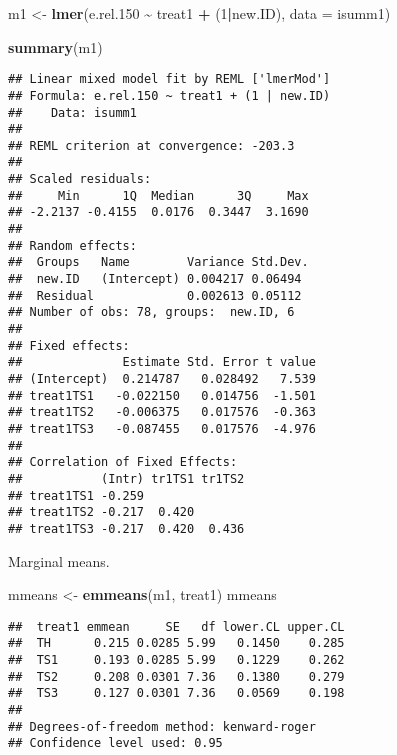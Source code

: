 \documentclass[
]{article}
\newenvironment{Shaded}{\begin{snugshade}}{\end{snugshade}}
\newcommand{\AttributeTok}[1]{\textcolor[rgb]{0.13,0.29,0.53}{#1}}
\newcommand{\DecValTok}[1]{\textcolor[rgb]{0.00,0.00,0.81}{#1}}
\newcommand{\FloatTok}[1]{\textcolor[rgb]{0.00,0.00,0.81}{#1}}
\newcommand{\FunctionTok}[1]{\textcolor[rgb]{0.13,0.29,0.53}{\textbf{#1}}}
\newcommand{\NormalTok}[1]{#1}
\newcommand{\OtherTok}[1]{\textcolor[rgb]{0.56,0.35,0.01}{#1}}
\newcommand{\SpecialCharTok}[1]{\textcolor[rgb]{0.81,0.36,0.00}{\textbf{#1}}}
\newcommand{\StringTok}[1]{\textcolor[rgb]{0.31,0.60,0.02}{#1}}
\begin{document}
\begin{Shaded}
\begin{Highlighting}[]
\NormalTok{m1 }\OtherTok{\textless{}{-}} \FunctionTok{lmer}\NormalTok{(e.rel}\FloatTok{.150} \SpecialCharTok{\textasciitilde{}}\NormalTok{ treat1 }\SpecialCharTok{+}\NormalTok{ (}\DecValTok{1}\SpecialCharTok{|}\NormalTok{new.ID), }\AttributeTok{data =}\NormalTok{ isumm1)}
\end{Highlighting}
\end{Shaded}

\begin{Shaded}
\begin{Highlighting}[]
\FunctionTok{summary}\NormalTok{(m1)}
\end{Highlighting}
\end{Shaded}

\begin{verbatim}
## Linear mixed model fit by REML ['lmerMod']
## Formula: e.rel.150 ~ treat1 + (1 | new.ID)
##    Data: isumm1
## 
## REML criterion at convergence: -203.3
## 
## Scaled residuals: 
##     Min      1Q  Median      3Q     Max 
## -2.2137 -0.4155  0.0176  0.3447  3.1690 
## 
## Random effects:
##  Groups   Name        Variance Std.Dev.
##  new.ID   (Intercept) 0.004217 0.06494 
##  Residual             0.002613 0.05112 
## Number of obs: 78, groups:  new.ID, 6
## 
## Fixed effects:
##              Estimate Std. Error t value
## (Intercept)  0.214787   0.028492   7.539
## treat1TS1   -0.022150   0.014756  -1.501
## treat1TS2   -0.006375   0.017576  -0.363
## treat1TS3   -0.087455   0.017576  -4.976
## 
## Correlation of Fixed Effects:
##           (Intr) tr1TS1 tr1TS2
## treat1TS1 -0.259              
## treat1TS2 -0.217  0.420       
## treat1TS3 -0.217  0.420  0.436
\end{verbatim}

Marginal means.

\begin{Shaded}
\begin{Highlighting}[]
\NormalTok{mmeans }\OtherTok{\textless{}{-}} \FunctionTok{emmeans}\NormalTok{(m1, }\StringTok{\textquotesingle{}treat1\textquotesingle{}}\NormalTok{)}
\NormalTok{mmeans}
\end{Highlighting}
\end{Shaded}

\begin{verbatim}
##  treat1 emmean     SE   df lower.CL upper.CL
##  TH      0.215 0.0285 5.99   0.1450    0.285
##  TS1     0.193 0.0285 5.99   0.1229    0.262
##  TS2     0.208 0.0301 7.36   0.1380    0.279
##  TS3     0.127 0.0301 7.36   0.0569    0.198
## 
## Degrees-of-freedom method: kenward-roger 
## Confidence level used: 0.95
\end{verbatim}
\end{document}
